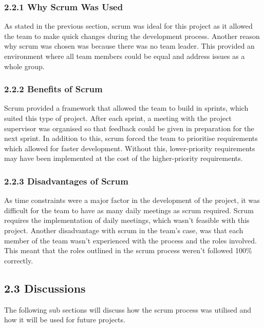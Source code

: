 \documentclass[11pt]{article}
\begin{document}
\begin{adjustwidth}{1cm}{}

\subsubsection{2.2.1 Why Scrum Was Used}
As stated in the previous section, scrum was ideal for this project as it allowed the team to make quick changes during the development process. Another reason why scrum was chosen was because there was no team leader. This provided an environment where all team members could be equal and address issues as a whole group. 

\subsubsection{2.2.2 Benefits of Scrum}
Scrum provided a framework that allowed the team to build in sprints, which suited this type of project. After each sprint, a meeting with the project supervisor was organised so that feedback could be given in preparation for the next sprint. In addition to this, scrum forced the team to prioritise requirements which allowed for faster development. Without this, lower-priority requirements may have been implemented at the cost of the higher-priority requirements.

\subsubsection{2.2.3 Disadvantages of Scrum}
As time constraints were a major factor in the development of the project, it was difficult for the team to have as many daily meetings as scrum required. Scrum requires the implementation of daily meetings, which wasn't feasible with this project. Another disadvantage with scrum in the team's case, was that each member of the team wasn't experienced with the process and the roles involved. This meant that the roles outlined in the scrum process weren't followed 100\% correctly.

\end{adjustwidth}

\subsection{2.3 Discussions}
The following sub sections will discuss how the scrum process was utilised and how it will be used for future projects.
\end{document}

